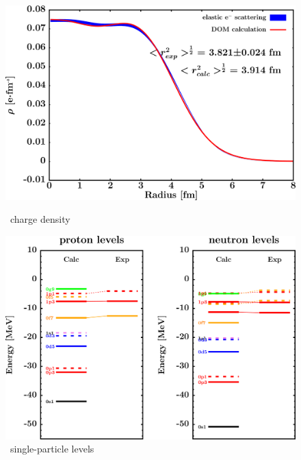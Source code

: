 \begin{figure}[hbtp]
    \centering
    \begin{minipage}{0.42\textwidth}
        \centering
        \includegraphics[width=\textwidth]{figures/ni64_chargeDensity.png}
        \caption*{\niFour\ charge density}
        \label{DOMFitData_ni64_chargeDensity}
    \end{minipage}\hspace{6pt}
    \begin{minipage}{0.42\textwidth}
        \centering
        \includegraphics[width=\textwidth]{figures/ni64_SPLevels.png}
        \caption*{\niFour\ single-particle levels}
        \label{DOMFitData_ni64_SPLevels}
    \end{minipage}
\end{figure}
